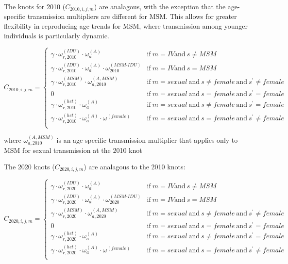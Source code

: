 \documentclass{article}
\begin{document}
The knots for 2010 ($C_{2010,i,j,m}$) are analagous, with the exception that the age-specific transmission multipliers are different for MSM. This allows for greater flexibility in reproducing age trends for MSM, where transmission among younger individuals is particularly dynamic.

\begin{equation}
C_{2010,i,j,m} = \begin{cases}
\gamma \cdot \omega^{(IDU)}_{r,2010} \cdot \omega^{(A)}_a & \text{if}\ m=IV \text{and}\ s\neq MSM \\
\gamma \cdot \omega^{(IDU)}_{r,2010} \cdot \omega^{(A)}_a \cdot \omega^{(MSM\text{-}IDU)}_{2010} & \text{if}\ m=IV \text{and}\ s=MSM\\
\gamma \cdot \omega^{(MSM)}_{r,2010} \cdot \omega^{(A,MSM)}_{a,2010} & \text{if}\ m=sexual\ \text{and}\ s\neq female\ \text{and}\ s^\prime\neq female\\
0 & \text{if}\ m=sexual\ \text{and}\ s=female\ \text{and}\ s^\prime=female\\
\gamma \cdot \omega^{(het)}_{r,2010} \cdot \omega^{(A)}_a & \text{if}\ m=sexual\ \text{and}\ s\neq female\ \text{and}\ s^\prime= female\\
\gamma \cdot \omega^{(het)}_{r,2010} \cdot \omega^{(A)}_a \cdot \omega^{(female)} & \text{if}\ m=sexual\ \text{and}\ s= female\ \text{and}\ s^\prime\neq female\\
\end{cases}
\end{equation}

where $\omega^{(A,MSM)}_{a,2010}$ is an age-specific transmission multiplier that applies only to MSM for sexual transmission at the 2010 knot

The 2020 knots ($C_{2020,i,j,m}$) are analagous to the 2010 knots:

\begin{equation}
C_{2020,i,j,m} = \begin{cases}
\gamma \cdot \omega^{(IDU)}_{r,2020} \cdot \omega^{(A)}_a & \text{if}\ m=IV \text{and}\ s\neq MSM \\
\gamma \cdot \omega^{(IDU)}_{r,2020} \cdot \omega^{(A)}_a \cdot \omega^{(MSM\text{-}IDU)}_{2020} & \text{if}\ m=IV \text{and}\ s=MSM\\
\gamma \cdot \omega^{(MSM)}_{r,2020} \cdot \omega^{(A,MSM)}_{a,2020} & \text{if}\ m=sexual\ \text{and}\ s\neq female\ \text{and}\ s^\prime\neq female\\
0 & \text{if}\ m=sexual\ \text{and}\ s=female\ \text{and}\ s^\prime=female\\
\gamma \cdot \omega^{(het)}_{r,2020} \cdot \omega^{(A)}_a & \text{if}\ m=sexual\ \text{and}\ s\neq female\ \text{and}\ s^\prime= female\\
\gamma \cdot \omega^{(het)}_{r,2020} \cdot \omega^{(A)}_a \cdot \omega^{(female)} & \text{if}\ m=sexual\ \text{and}\ s= female\ \text{and}\ s^\prime\neq female\\
\end{cases}
\end{equation}
\end{document}
